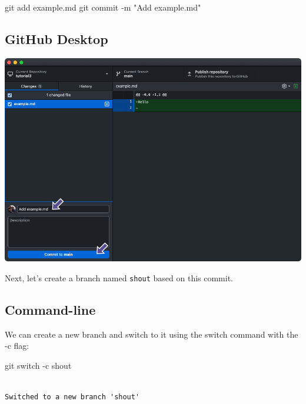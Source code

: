 \documentclass[
  letterpaper,
  DIV=11,
  numbers=noendperiod]{scrartcl}
\newenvironment{Shaded}{\begin{snugshade}}{\end{snugshade}}
\newcommand{\AttributeTok}[1]{\textcolor[rgb]{0.40,0.45,0.13}{#1}}
\newcommand{\FunctionTok}[1]{\textcolor[rgb]{0.28,0.35,0.67}{#1}}
\newcommand{\NormalTok}[1]{\textcolor[rgb]{0.00,0.23,0.31}{#1}}
\newcommand{\StringTok}[1]{\textcolor[rgb]{0.13,0.47,0.30}{#1}}
\begin{document}
\begin{Shaded}
\begin{Highlighting}[]
\FunctionTok{git}\NormalTok{ add example.md}
\FunctionTok{git}\NormalTok{ commit }\AttributeTok{{-}m} \StringTok{"Add example.md"}
\end{Highlighting}
\end{Shaded}

\subsection{GitHub Desktop}

\includegraphics{images/image28.png}

Next, let's create a branch named \texttt{shout} based on this commit.

\subsection{Command-line}

We can create a new branch and switch to it using the switch command
with the -c flag:

\begin{Shaded}
\begin{Highlighting}[]
\FunctionTok{git}\NormalTok{ switch }\AttributeTok{{-}c}\NormalTok{ shout}
\end{Highlighting}
\end{Shaded}

\begin{verbatim}

Switched to a new branch 'shout'
\end{verbatim}
\end{document}

